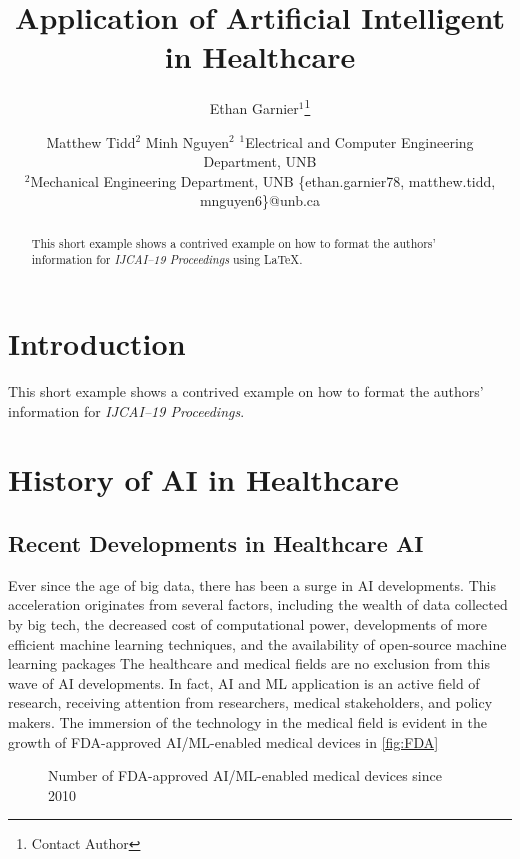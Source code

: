 \documentclass{article}
\title{Application of Artificial Intelligent in Healthcare}
\author{
Ethan Garnier$^1$\footnote{Contact Author}\and
Matthew Tidd$^2$\And
Minh Nguyen$^{2}$
\affiliations
$^1$Electrical and Computer Engineering Department, UNB\\
$^2$Mechanical Engineering Department, UNB
\emails
\{ethan.garnier78, matthew.tidd, mnguyen6\}@unb.ca
}
\begin{document}
\maketitle

\begin{abstract}
This short example shows a contrived example on how to format the authors' information for {\it IJCAI--19 Proceedings} using \LaTeX{}.
\end{abstract}

\section{Introduction}

This short example shows a contrived example on how to format the authors' information for {\it IJCAI--19 Proceedings}.
\section{History of AI in Healthcare}
\subsection{Recent Developments in Healthcare AI}
Ever since the age of big data, there has been a surge in AI developments. 
This acceleration originates from several factors, including the wealth of data collected by big tech, the decreased cost of computational power, developments of more efficient machine learning techniques, and the availability of open-source machine learning packages
The healthcare and medical fields are no exclusion from this wave of AI developments. 
In fact, AI and ML application is an active field of research, receiving attention from researchers, medical stakeholders, and policy makers.
The immersion of the technology in the medical field is evident in the growth of FDA-approved AI/ML-enabled medical devices in \autoref{fig:FDA} \cite{FDA_artificial_nodate}

\begin{figure}[htbp]
    \caption{Number of FDA-approved AI/ML-enabled medical devices since 2010} 
    \label{fig:FDA}
\end{figure}
\end{document}
